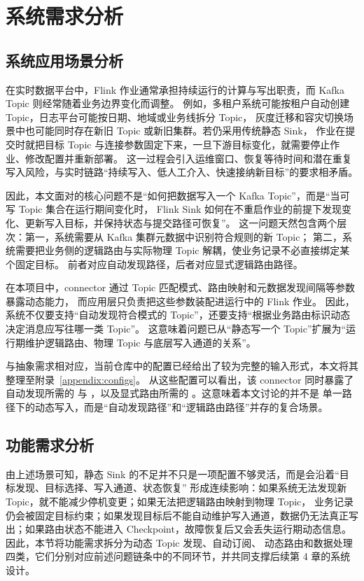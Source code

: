 
\chapter{系统需求分析}

\section{系统应用场景分析}

在实时数据平台中，Flink 作业通常承担持续运行的计算与写出职责，而 Kafka Topic 则经常随着业务边界变化而调整。
例如，多租户系统可能按租户自动创建 Topic，日志平台可能按日期、地域或业务线拆分 Topic，
灰度迁移和容灾切换场景中也可能同时存在新旧 Topic 或新旧集群。若仍采用传统静态 Sink，
作业在提交时就把目标 Topic 与连接参数固定下来，一旦下游目标变化，就需要停止作业、修改配置并重新部署。
这一过程会引入运维窗口、恢复等待时间和潜在重复写入风险，与实时链路“持续写入、低人工介入、快速接纳新目标”的要求相矛盾。

因此，本文面对的核心问题不是“如何把数据写入一个 Kafka Topic”，而是“当可写 Topic 集合在运行期间变化时，
Flink Sink 如何在不重启作业的前提下发现变化、更新写入目标，并保持状态与提交路径可恢复”。
这一问题天然包含两个层次：第一，系统需要从 Kafka 集群元数据中识别符合规则的新 Topic；
第二，系统需要把业务侧的逻辑路由与实际物理 Topic 解耦，使业务记录不必直接绑定某个固定目标。
前者对应自动发现路径，后者对应显式逻辑路由路径。

在本项目中，connector 通过 Topic 匹配模式、路由映射和元数据发现间隔等参数暴露动态能力，
而应用层只负责把这些参数装配进运行中的 Flink 作业。
因此，系统不仅要支持“自动发现符合模式的 Topic”，还要支持“根据业务路由标识动态决定消息应写往哪一类 Topic”。
这意味着问题已从“静态写一个 Topic”扩展为“运行期维护逻辑路由、物理 Topic 与底层写入通道的关系”。

与抽象需求相对应，当前仓库中的配置已经给出了较为完整的输入形式，本文将其整理至附录~\ref{appendix:configs}。
从这些配置可以看出，该 connector 同时暴露了自动发现所需的  与
，以及显式路由所需的 。这意味着本文讨论的并不是
单一路径下的动态写入，而是“自动发现路径”和“逻辑路由路径”并存的复合场景。

\section{功能需求分析}

由上述场景可知，静态 Sink 的不足并不只是一项配置不够灵活，而是会沿着“目标发现、目标选择、写入通道、状态恢复”
形成连续影响：如果系统无法发现新 Topic，就不能减少停机变更；如果无法把逻辑路由映射到物理 Topic，
业务记录仍会被固定目标约束；如果发现目标后不能自动维护写入通道，数据仍无法真正写出；如果路由状态不能进入
Checkpoint，故障恢复后又会丢失运行期动态信息。因此，本节将功能需求拆分为动态 Topic 发现、自动订阅、
动态路由和数据处理四类，它们分别对应前述问题链条中的不同环节，并共同支撑后续第 4 章的系统设计。

